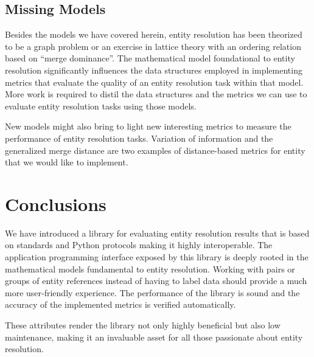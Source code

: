 \documentclass[11pt]{article}
\begin{document}
    \subsection{Missing Models}

    Besides the models we have covered herein, entity resolution has been
    theorized to be a graph problem\cite{eager2021} or an exercise in lattice
    theory with an ordering relation based on
    ``merge dominance''\cite{Ben2009Swoosh}.
    The mathematical model foundational to entity resolution significantly
    influences the data structures employed in implementing metrics that
    evaluate the quality of an entity resolution task within that model.
    More work is required to distil the data structures and the metrics we can
    use to evaluate entity resolution tasks using those models.

    New models might also bring to light new interesting metrics to
    measure the performance of entity resolution tasks.
    Variation of information\cite{meila2007vi} and the generalized merge
    distance\cite{Men10} are two examples of distance-based metrics for entity
    that we would like to implement.

    \section{Conclusions}\label{sec:conclusions}

    We have introduced a library for evaluating entity resolution results that
    is based on standards and Python protocols making it highly interoperable.
    The application programming interface exposed by this library is deeply
    rooted in the mathematical models fundamental to entity resolution.
    Working with pairs or groups of entity references instead of having to label
    data should provide a much more user-friendly experience.
    The performance of the library is sound and the accuracy of the implemented
    metrics is verified automatically.

    These attributes render the library not only highly beneficial but also low
    maintenance, making it an invaluable asset for all those passionate about
    entity resolution.

    
\end{document}
